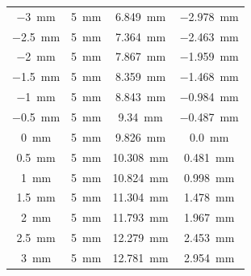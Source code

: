 \begin{table}[ht]
\begin{tabular}{| c | c | c | c |}
        \SI{-3}{mm}           & \SI{5}{mm}     & \SI{6.849}{mm}      & \SI{-2.978}{mm}   \\
        \SI{-2.5}{mm}         & \SI{5}{mm}     & \SI{7.364}{mm}      & \SI{-2.463}{mm}   \\
        \SI{-2}{mm}           & \SI{5}{mm}     & \SI{7.867}{mm}      & \SI{-1.959}{mm}   \\
        \SI{-1.5}{mm}         & \SI{5}{mm}     & \SI{8.359}{mm}      & \SI{-1.468}{mm}   \\
        \SI{-1}{mm}           & \SI{5}{mm}     & \SI{8.843}{mm}      & \SI{-0.984}{mm}   \\
        \SI{-0.5}{mm}         & \SI{5}{mm}     & \SI{9.34}{mm}       & \SI{-0.487}{mm}   \\
        \SI{0}{mm}            & \SI{5}{mm}     & \SI{9.826}{mm}      & \SI{0.0}{mm}      \\
        \SI{0.5}{mm}          & \SI{5}{mm}     & \SI{10.308}{mm}     & \SI{0.481}{mm}    \\
        \SI{1}{mm}            & \SI{5}{mm}     & \SI{10.824}{mm}     & \SI{0.998}{mm}    \\
        \SI{1.5}{mm}          & \SI{5}{mm}     & \SI{11.304}{mm}     & \SI{1.478}{mm}    \\
        \SI{2}{mm}            & \SI{5}{mm}     & \SI{11.793}{mm}     & \SI{1.967}{mm}    \\
        \SI{2.5}{mm}          & \SI{5}{mm}     & \SI{12.279}{mm}     & \SI{2.453}{mm}    \\
        \SI{3}{mm}            & \SI{5}{mm}     & \SI{12.781}{mm}     & \SI{2.954}{mm}    \\
        \hline
    \end{tabular}
    \label{tab:d425}
\end{table}



